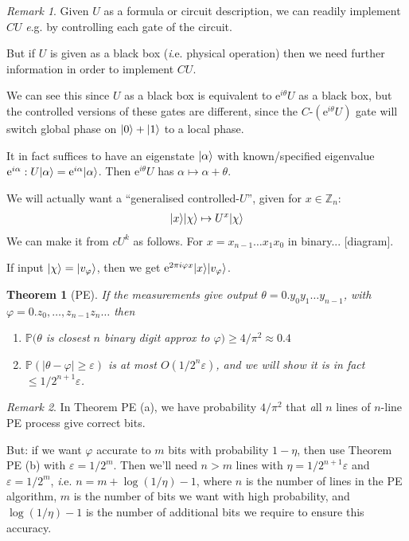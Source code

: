 \documentclass[]{article}
\DeclarePairedDelimiter\ket{\lvert}{\rangle}
\theoremstyle{custhm}
\theoremstyle{cusdef}
\theoremstyle{custhm}
\theoremstyle{custhm}
\theoremstyle{custhm}
\theoremstyle{custhm}
\newtheorem*{theorem*}{Theorem}
\theoremstyle{cusdef}
\theoremstyle{remark}
\newtheorem*{remark*}{Remark}
\newcommand{\Z}{\mathbb{Z}}
\newcommand{\e}{\mathrm{e}}
\newcommand{\eps}{\varepsilon}
\renewcommand{\P}{\mathbb{P}}
\renewcommand{\it}[1]{\textit{#1}}
\renewcommand{\phi}{\varphi}
\begin{document}
\begin{remark*}
Given $U$ as a formula or circuit description, we can readily implement $CU$ {\it e.g.} by controlling each gate of the circuit.

But if $U$ is given as a black box ({\it i.e.} physical operation) then we need further information in order to implement $CU$.

We can see this since $U$ as a black box is equivalent to $\e^{i\theta}U$ as a black box, but the controlled versions of these gates are different, since the $C$-$(\e^{i\theta}U)$ gate will switch global phase on $\ket{0} + \ket{1}$ to a local phase.

It in fact suffices to have an eigenstate $\ket{\alpha}$ with known/specified eigenvalue $\e^{i\alpha}: U\ket{\alpha} = \e^{i\alpha}\ket{\alpha}$. Then $\e^{i\theta}U$ has $\alpha \mapsto \alpha + \theta$.
\end{remark*}


We will actually want a ``generalised controlled-$U$'', given for $x \in \Z_n$:
\begin{align*}
	{\ket{x}}\ket{\chi} \mapsto U^x\ket{\chi}
\end{align*}
We can make it from $cU^k$ as follows. For $x = x_{n-1}\dots x_1x_0$ in binary... [diagram].

If input $\ket{\chi} = \ket{v_\phi}$, then we get $\e^{2\pi i\phi x}\ket{x}\ket{v_\phi}$.


\begin{theorem*}[PE]
If the measurements give output $\theta = 0.y_0y_1\dots y_{n-1}$, with $\phi = 0.z_0,\dots,z_{n-1}z_{n}\dots$ then
\begin{enumerate}[label=(\alph*)]
	\item $\P(\theta$ is closest $n$ binary digit approx to $\phi) \ge 4/\pi^2 \approx 0.4$
	\item $\P(|\theta - \phi| \ge \eps)$ is at most $O(1/2^n\eps)$, and we will show it is in fact $\le 1/2^{n+1}\eps$.
\end{enumerate}
\end{theorem*}

\begin{remark*}
In Theorem PE (a), we have probability $4/\pi^2$ that {\it all} $n$ lines of $n$-line PE process give correct bits.

But: if we want $\phi$ accurate to $m$ bits with probability $1 - \eta$, then use Theorem PE (b) with $\eps = 1/2^m$. Then we'll need $n > m$ lines with $\eta = 1/2^{n+1}\eps$ and $\eps = 1/2^m$, {\it i.e.} $n = m + \log (1/\eta) -1$, where $n$ is the number of lines in the PE algorithm, $m$ is the number of bits we want with high probability, and $\log(1/\eta) -1 $ is the number of additional bits we require to ensure this accuracy.
\end{remark*}
\end{document}
